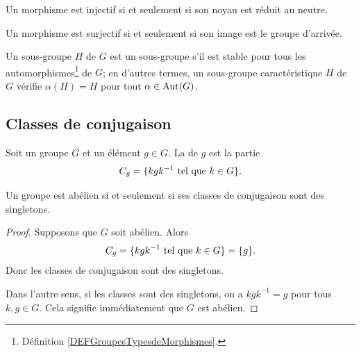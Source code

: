 \begin{lemma}
Un morphisme est injectif si et seulement si son noyau est réduit au neutre.

Un morphisme est surjectif si et seulement si son image est le groupe d'arrivée.
\end{lemma}

\begin{definition}      \label{DEFooUXXTooCCLmQe}
    Un sous-groupe \( H\) de \( G\) est un sous-groupe  s'il est stable pour tous les automorphismes\footnote{Définition \ref{DEFGroupesTypesdeMorphismes}.} de \(G \); en d'autres termes, un sous-groupe caractéristique \(H \) de \(G \) vérifie \( \alpha(H)=H\) pour tout \( \alpha\in \operatorname{Aut}(G)\).
\end{definition}


\subsection{Classes de conjugaison}

\begin{definition}
    Soit un groupe \( G\) et un élément \( g\in G\). La  de \( g\) est la partie
    \begin{equation}
        C_g=\{ kgk^{-1}\text{ tel que } k\in G \}.
    \end{equation}
\end{definition}

\begin{lemma}       \label{LEMooQYBJooYwMwGM}
    Un groupe est abélien si et seulement si ses classes de conjugaison sont des singletons.
\end{lemma}

\begin{proof}
    Supposons que \( G\) soit abélien. Alors
    \begin{equation}
        C_g=\{ kgk^{-1}\text{ tel que } k\in G \}=\{ g \}.
    \end{equation}
    Donc les classes de conjugaison sont des singletons.

    Dans l'autre sens, si les classes sont des singletons, on a \( kgk^{-1}=g\) pour tous \( k,g\in G\). Cela signifie immédiatement que \( G\) est abélien.
\end{proof}


